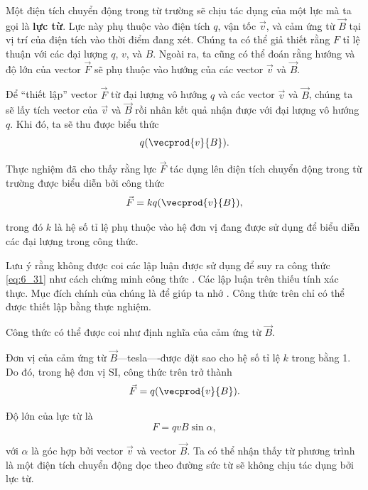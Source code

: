 Một điện tích chuyển động trong từ trường sẽ chịu tác dụng của một lực mà ta gọi là \textbf{lực từ}. Lực này phụ thuộc vào điện tích $q$, vận tốc $\vec{v}$, và cảm ứng từ $\vec{B}$ tại vị trí của điện tích vào thời điểm đang xét. Chúng ta có thể giả thiết rằng $F$ tỉ lệ thuận với các đại lượng $q$, $v$, và $B$. Ngoài ra, ta cũng có thể đoán rằng hướng và độ lớn của vector $\vec{F}$ sẽ phụ thuộc vào hướng của các vector $\vec{v}$ và $\vec{B}$. 

Để ``thiết lập'' vector $\vec{F}$ từ đại lượng vô hướng $q$ và các vector $\vec{v}$ và $\vec{B}$, chúng ta sẽ lấy tích vector của $\vec{v}$ và $\vec{B}$ rồi nhân kết quả nhận được với đại lượng vô hướng $q$. Khi đó, ta sẽ thu được biểu thức
\begin{equation}\label{eq:6_31}
    q (\vecprod{v}{B}).
\end{equation}

Thực nghiệm đã cho thấy rằng lực $\vec{F}$ tác dụng lên điện tích chuyển động trong từ trường được biểu diễn bởi công thức
\begin{equation}\label{eq:6_32}
    \vec{F} = k q (\vecprod{v}{B}),
\end{equation}

\noindent
trong đó $k$ là hệ số tỉ lệ phụ thuộc vào hệ đơn vị đang được sử dụng để biểu diễn các đại lượng trong công thức.

Lưu ý rằng không được coi các lập luận được sử dụng để suy ra công thức \eqref{eq:6_31} như cách chứng minh công thức . Các lập luận trên thiếu tính xác thực. Mục đích chính của chúng là để giúp ta nhớ . Công thức trên chỉ có thể được thiết lập bằng thực nghiệm.

Công thức  có thể được coi như định nghĩa của cảm ứng từ $\vec{B}$.

Đơn vị của cảm ứng từ $\vec{B}$---tesla----được đặt sao cho hệ số tỉ lệ $k$ trong  bằng 1. Do đó, trong hệ đơn vị SI, công thức trên trở thành
\begin{equation}\label{eq:6_33}
    \vec{F} = q (\vecprod{v}{B}).
\end{equation}

Độ lớn của lực từ là
\begin{equation}\label{eq:6_34}
    F = q v B \sin\alpha,
\end{equation}

\noindent
với $\alpha$ là góc hợp bởi vector $\vec{v}$ và vector $\vec{B}$. Ta có thể nhận thấy từ phương trình  là một điện tích chuyển động dọc theo đường sức từ sẽ không chịu tác dụng bởi lực từ. 

